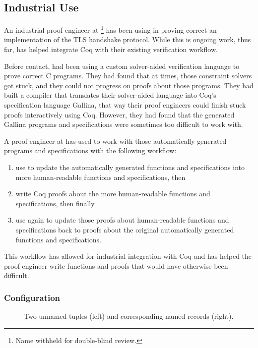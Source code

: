\subsection{Industrial Use}
\label{sec:industry}

An industrial proof engineer at \company\footnote{Name withheld for double-blind review.} has been using \toolname in proving
correct an implementation of the TLS handshake protocol.
While this is ongoing work, thus far,
\toolname has helped \company integrate Coq with their existing verification workflow.

Before contact, \company had been using a custom solver-aided verification language to prove correct C programs.
They had found that at times, those constraint solvers got stuck, and they could not
progress on proofs about those programs.
They had built a compiler that translates their solver-aided language into Coq's specification language Gallina,
that way their proof engineers could finish stuck proofs interactively using Coq.
However, they had found that the generated Gallina programs and specifications were sometimes too difficult to work with.

A proof engineer at \company has used \toolname to work with those automatically generated programs and specifications
with the following workflow:

\begin{enumerate}
\item use \toolname to update the automatically generated functions and specifications into more
human-readable functions and specifications, then
\item write Coq proofs about the more human-readable functions and specifications, then finally
\item use \toolname again to update those proofs about human-readable functions and specifications back to
proofs about the original automatically generated functions and specifications.
\end{enumerate}
This workflow has allowed for industrial integration with Coq and has helped the proof engineer write functions and proofs
that would have otherwise been difficult.


\subsubsection{Configuration}

\begin{figure}
\begin{minipage}{0.33\textwidth}
   
\end{minipage}
\hfill
\begin{minipage}{0.66\textwidth}
   
\end{minipage}
\vspace{-0.3cm}
\caption{Two unnamed tuples (left) and corresponding named records (right).}
\label{fig:records}
\end{figure}

